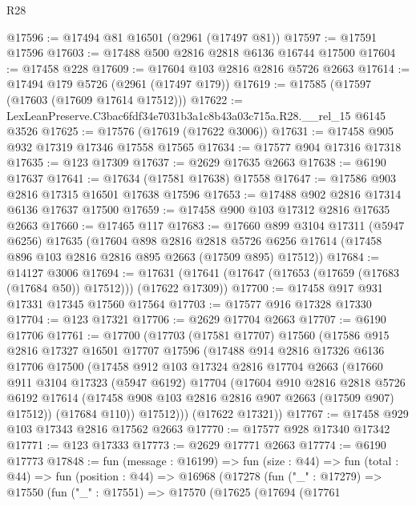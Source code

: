 \begin{lexlean}{R28}
\begin{coremodule}
@17596 := @17494 @81 @16501 (@2961 (@17497 @81))
@17597 := @17591 @17596
@17603 := @17488 @500 @2816 @2818 @6136 @16744 @17500
@17604 := @17458 @228
@17609 := @17604 @103 @2816 @2816 @5726 @2663
@17614 := @17494 @179 @5726 (@2961 (@17497 @179))
@17619 := @17585 (@17597 (@17603 (@17609 @17614 @17512)))
@17622 := LexLeanPreserve.C3bac6fdf34e7031b3a1c8b43a03c715a.R28.__rel_15 @6145 @3526
@17625 := @17576 (@17619 (@17622 @3006))
@17631 := @17458 @905 @932 @17319 @17346 @17558 @17565
@17634 := @17577 @904 @17316 @17318
@17635 := @123 @17309
@17637 := @2629 @17635 @2663
@17638 := @6190 @17637
@17641 := @17634 (@17581 @17638) @17558
@17647 := @17586 @903 @2816 @17315 @16501 @17638 @17596
@17653 := @17488 @902 @2816 @17314 @6136 @17637 @17500
@17659 := @17458 @900 @103 @17312 @2816 @17635 @2663
@17660 := @17465 @117
@17683 := @17660
    @899
    @3104
    @17311
    (@5947 @6256)
    @17635
    (@17604
      @898
      @2816
      @2818
      @5726
      @6256
      @17614
      (@17458 @896 @103 @2816 @2816 @895 @2663 (@17509 @895) @17512))
@17684 := @14127 @3006
@17694 := @17631 (@17641 (@17647 (@17653 (@17659 (@17683 (@17684 @50)) @17512))) (@17622 @17309))
@17700 := @17458 @917 @931 @17331 @17345 @17560 @17564
@17703 := @17577 @916 @17328 @17330
@17704 := @123 @17321
@17706 := @2629 @17704 @2663
@17707 := @6190 @17706
@17761 := @17700
    (@17703
      (@17581 @17707)
      @17560
      (@17586
        @915
        @2816
        @17327
        @16501
        @17707
        @17596
        (@17488
          @914
          @2816
          @17326
          @6136
          @17706
          @17500
          (@17458
            @912
            @103
            @17324
            @2816
            @17704
            @2663
            (@17660
              @911
              @3104
              @17323
              (@5947 @6192)
              @17704
              (@17604
                @910
                @2816
                @2818
                @5726
                @6192
                @17614
                (@17458 @908 @103 @2816 @2816 @907 @2663 (@17509 @907) @17512))
              (@17684 @110))
            @17512)))
      (@17622 @17321))
@17767 := @17458 @929 @103 @17343 @2816 @17562 @2663
@17770 := @17577 @928 @17340 @17342
@17771 := @123 @17333
@17773 := @2629 @17771 @2663
@17774 := @6190 @17773
@17848 := fun (message : @16199) =>
  fun (size : @44) =>
  fun (total : @44) =>
  fun (position : @44) =>
  @16968
    (@17278
      (fun ("_" : @17279) =>
      @17550
        (fun ("_" : @17551) =>
        @17570
          (@17625
            (@17694
              (@17761

\end{coremodule}
\end{lexlean}
